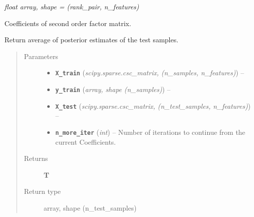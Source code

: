 \documentclass[letterpaper,10pt,english]{sphinxmanual}
\begin{document}
\begin{fulllineitems}

\begin{fulllineitems}
\label{api:fastFM.mcmc.FMRegression.V_}
\emph{float \textbar{} array, shape = (rank\_pair, n\_features)}

Coefficients of second order factor matrix.

\end{fulllineitems}


\begin{fulllineitems}
\label{api:fastFM.mcmc.FMRegression.fit_predict}
Return average of posterior estimates of the test samples.
\begin{quote}\begin{description}
\item[{Parameters}] \leavevmode\begin{itemize}
\item {} 
\textbf{\texttt{X\_train}} (\emph{scipy.sparse.csc\_matrix, (n\_samples, n\_features)}) -- 

\item {} 
\textbf{\texttt{y\_train}} (\emph{array, shape (n\_samples)}) -- 

\item {} 
\textbf{\texttt{X\_test}} (\emph{scipy.sparse.csc\_matrix, (n\_test\_samples, n\_features)}) -- 

\item {} 
\textbf{\texttt{n\_more\_iter}} (\emph{int}) -- Number of iterations to continue from the current Coefficients.

\end{itemize}

\item[{Returns}] \leavevmode
\textbf{T}

\item[{Return type}] \leavevmode
array, shape (n\_test\_samples)

\end{description}\end{quote}

\end{fulllineitems}


\end{fulllineitems}
\end{document}
